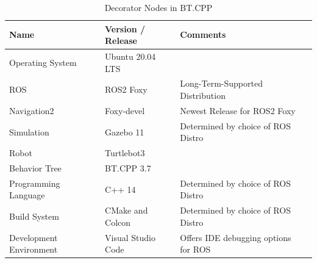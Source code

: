 \begin{center}
\begin{table}[ht]
	\caption{Decorator Nodes in BT.CPP}
	\label{tab:versions}
	\begin{tabular}{ | m{} | m{}| m{} | m{} |} 
  	\hline
  	\textbf{Name} & \textbf{Version / Release} & \textbf{Comments} \\ 
  	\hline
  	Operating System & Ubuntu 20.04 LTS &  \\ 
  	\hline
  	ROS & ROS2 Foxy & Long-Term-Supported Distribution \\ 
  	\hline
  	Navigation2 & Foxy-devel & Newest Release for ROS2 Foxy\\
  	\hline
  	Simulation & Gazebo 11 & Determined by choice of ROS Distro \\
  	\hline  	
  	Robot & Turtlebot3 &  \\
  	\hline
  	Behavior Tree & BT.CPP 3.7 & \\
  	\hline
  	Programming Language & C++ 14 & Determined by choice of ROS Distro \\
  	\hline
  	Build System & CMake and Colcon & Determined by choice of ROS Distro \\
  	\hline
  	Development Environment & Visual Studio Code & Offers IDE debugging options for ROS \\
  	\hline
	\end{tabular}
\end{table}
\end{center}
